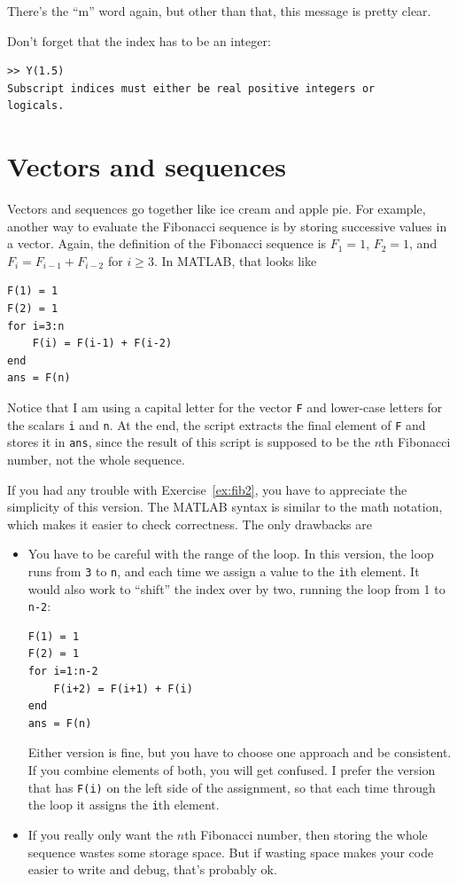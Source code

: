 \documentclass[
]{book}
\begin{document}
There's the ``m'' word again, but other than that, this message
is pretty clear.

Don't forget that the index has to be an integer:

\begin{verbatim}
>> Y(1.5)
Subscript indices must either be real positive integers or
logicals.
\end{verbatim}


\section{Vectors and sequences}

Vectors and sequences go together like ice cream and apple pie.  For
example, another way to evaluate the Fibonacci sequence is by
storing successive values in a vector.  Again, the definition of the
Fibonacci sequence is $F_1 = 1$, $F_2 = 1$, and $F_{i} = F_{i-1} +
F_{i-2}$ for $i \ge 3$.  In MATLAB, that looks like

\begin{verbatim}
F(1) = 1
F(2) = 1
for i=3:n
    F(i) = F(i-1) + F(i-2)
end
ans = F(n)
\end{verbatim}

Notice that I am using a capital letter for the vector {\tt F}
and lower-case letters for the scalars {\tt i} and {\tt n}.
At the end, the script extracts the final element of {\tt F} and
stores it in {\tt ans}, since the result of this script is supposed
to be the $n$th Fibonacci number, not the whole sequence.

If you had any trouble with Exercise~\ref{ex:fib2}, you have to
appreciate the simplicity of this version.  The MATLAB syntax is
similar to the math notation, which makes it easier to check
correctness.  The only drawbacks are

\begin{itemize}

\item You have to be careful with the range of the
loop.  In this version, the loop runs from {\tt 3} to {\tt n},
and each time we assign a value to the {\tt i}th element.  It
would also work to ``shift'' the index over by two,
running the loop from 1 to {\tt n-2}:

\begin{verbatim}
F(1) = 1
F(2) = 1
for i=1:n-2
    F(i+2) = F(i+1) + F(i)
end
ans = F(n)
\end{verbatim}

Either version is fine, but you have to choose one approach
and be consistent.  If you combine elements of both, you will
get confused.  I prefer the version that has {\tt F(i)} on the
left side of the assignment, so that each time through the loop
it assigns the {\tt i}th element.

\item If you really only want the $n$th Fibonacci number, then storing
the whole sequence wastes some storage space.  But if wasting space
makes your code easier to write and debug, that's probably ok.

\end{itemize}
\end{document}
